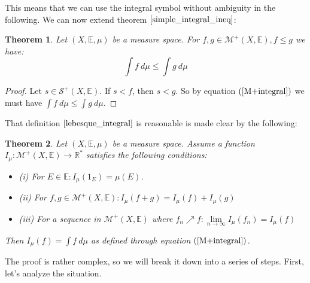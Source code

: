 \documentclass[12pt, a4paper]{article}
\newtheorem{theorem}{Theorem}[section]
\numberwithin{equation}{section}
\begin{document}
This means that we can use the integral symbol without ambiguity in the following. We can now extend theorem $\ref{simple_integral_ineq}$:

\begin{theorem}
\label{integral_ineq}
Let $(X,\mathbb{E},\mu)$ be a measure space. For $f,g\in\mathcal{M}^+(X,\mathbb{E}), f\le g$ we have:
\begin{equation}
\int f\ d\mu\le\int g\ d\mu
\end{equation}
\end{theorem}
\begin{proof}
Let $s\in\mathcal{S}^+(X,\mathbb{E})$. If $s<f$, then $s<g$. So by equation $(\ref{M+integral})$ we must have $\int f\ d\mu\le\int g\ d\mu$.
\end{proof}

That definition $\ref{lebesque_integral}$ is reasonable is made clear by the following:

\begin{theorem}
\label{unique_integral_exists}
Let $(X,\mathbb{E},\mu)$ be a measure space. Assume a function $I_\mu: \mathcal{M}^+(X,\mathbb{E})\rightarrow\mathbb{R}^*$ satisfies the following conditions:
\begin{itemize}
\item (i) For $E\in\mathbb{E}: I_\mu(1_E)=\mu(E)$.
\item (ii) For $f,g\in\mathcal{M}^+(X,\mathbb{E}): I_\mu(f+g)=I_\mu(f)+I_\mu(g)$
\item (iii) For a sequence in $\mathcal{M}^+(X,\mathbb{E})$ where $f_n\nearrow f: \underset{n\rightarrow\infty}{\lim}I_\mu(f_n)=I_\mu(f)$
\end{itemize}
Then $I_\mu(f)=\int f\ d\mu$ as defined through equation $(\ref{M+integral})$.
\end{theorem}

The proof is rather complex, so we will break it down into a series of steps. First, let's analyze the situation.
\end{document}
